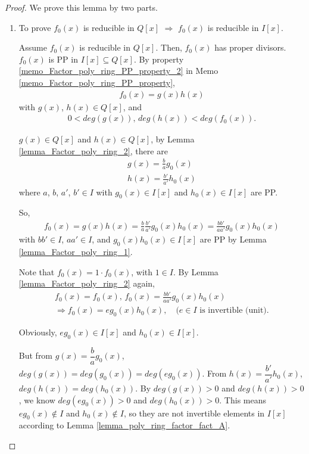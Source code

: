 \documentclass[utf8]{ctexbook}
\begin{document}
\begin{proof}
We prove this lemma by two parts.
\begin{enumerate}
\item{To prove $f_0 (x)$ is reducible in $Q[x]$ $\Longrightarrow$ $f_0 (x)$ is reducible in $I[x]$.

Assume $f_0 (x)$ is reducible in $Q[x]$. Then, $f_0 (x)$ has proper divisors. $f_0 (x)$ is PP in $I[x] \subseteq Q[x]$. By property \ref{memo_Factor_poly_ring_PP_property_2} in Memo \ref{memo_Factor_poly_ring_PP_property}, 
\begin{align*}
f_0 (x) = g(x) h(x)
\end{align*} 
with $g(x)$, $h(x) \in Q[x]$, and
\begin{align*}
0 < deg(g(x)), \, deg(h(x)) < deg(f_0 (x)) .
\end{align*}

$g(x) \in Q[x]$ and $h(x) \in Q[x]$, by Lemma \ref{lemma_Factor_poly_ring_2}, there are 
\begin{align*}
g(x) = \frac{b}{a} g_0 (x) \\
h(x) = \frac{b'}{a'} h_0 (x) 
\end{align*}
where $a$, $b$, $a'$, $b' \in I$ with $g_0 (x) \in I[x]$ and $h_0 (x) \in I[x]$ are PP.

So,
\begin{align*}
f_0 (x) = g(x) h(x) = \frac{b}{a} \frac{b'}{a'} g_0 (x) h_0 (x) = \frac{b b'}{a a'} g_0 (x) h_0 (x)
\end{align*}
with $b b' \in I$, $a a' \in I$, and $g_0 (x) h_0 (x) \in I[x]$ are PP by Lemma \ref{lemma_Factor_poly_ring_1}.

Note that $f_0 (x) = 1 \cdot f_0 (x)$, with $1 \in I$. By Lemma \ref{lemma_Factor_poly_ring_2} again,
\begin{align*}
f_0 (x) = f_0 (x) , \, f_0 (x) = \frac{b b'}{a a'} g_0 (x) h_0 (x) \\
\Longrightarrow f_0 (x) = e g_0 (x) h_0 (x), \quad (e \in I \mbox{ is invertible (unit)} .
\end{align*}

Obviously, $e g_0 (x) \in I[x]$ and $h_0 (x) \in I[x]$.

But from $g(x) = \dfrac{b}{a} g_0 (x)$, $deg(g(x)) = deg(g_0 (x)) = deg(e g_0 (x))$. From $h(x) = \dfrac{b'}{a'} h_0 (x) $, $deg(h(x)) = deg(h_0 (x))$. By $deg(g(x))> 0$ and $deg(h(x)) > 0$, we know $deg(e g_0 (x)) > 0$ and $deg(h_0 (x)) > 0$. This means $e g_0 (x) \not \in I$ and $h_0 (x) \not \in I$, so they are not invertible elements in $I[x]$ according to Lemma \ref{lemma_poly_ring_factor_fact_A}.

}
\end{enumerate}
\end{proof}
\end{document}
